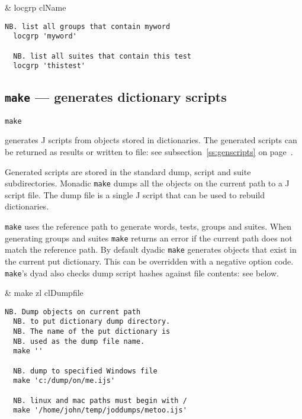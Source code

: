 \begin{wordhead}
\monad & locgrp clName \\
\end{wordhead} 
\begin{lstlisting}[frame=single,framerule=0pt]  
  NB. list all groups that contain myword
  locgrp 'myword' 

  NB. list all suites that contain this test
  locgrp 'thistest' 
\end{lstlisting}


\subsection{\texttt{make} --- generates dictionary scripts}\label{ss:make}

\hypertarget{il:make}{\texttt{make}} generates J 
scripts from objects stored
in dictionaries.
The generated scripts can be returned as results or written to file: 
see subsection~\ref{ss:genscripts} on page~\pageref{ss:genscripts}.

Generated scripts are stored in the standard dump, 
script and suite subdirectories.  Monadic \texttt{make} dumps all the objects 
on the current path to a J script file.  The dump file is a single J script 
that can be used to rebuild dictionaries. 

\texttt{make} uses the reference path to generate words, 
tests, groups and suites.
When generating groups and suites \texttt{make} returns an error if the current 
path does not match the reference path. By default dyadic \texttt{make} generates 
objects that exist in the current put dictionary. 
This can be overridden with a negative option code.  \texttt{make}'s dyad also
checks dump script hashes against file contents: see below.

\begin{wordhead}
\monad & make zl \argsep clDumpfile \\
\end{wordhead}
\begin{lstlisting}[frame=single,framerule=0pt] 
  NB. Dump objects on current path 
  NB. to put dictionary dump directory.
  NB. The name of the put dictionary is 
  NB. used as the dump file name.
  make '' 

  NB. dump to specified Windows file
  make 'c:/dump/on/me.ijs'
  
  NB. linux and mac paths must begin with /
  make '/home/john/temp/joddumps/metoo.ijs'
\end{lstlisting}

